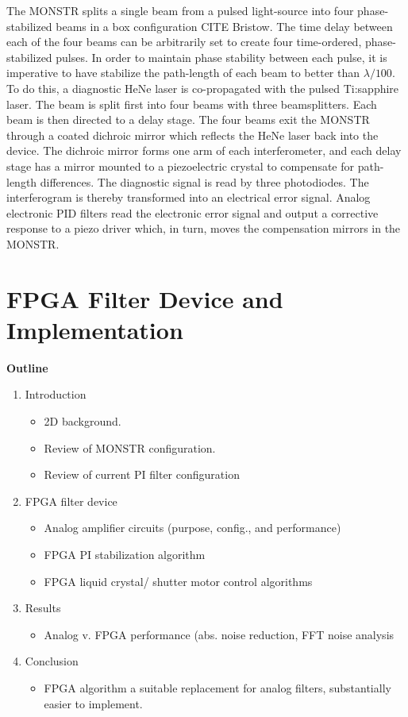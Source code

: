 \documentclass[letterpaper,12pt,amsmath,reprint,aip,jmp,twocolumn]{revtex4-1}
\begin{document}
\indent The MONSTR splits a single beam from a pulsed light-source into four phase-stabilized beams in a box configuration CITE Bristow. The time delay between each of the four beams can be arbitrarily set to create four time-ordered, phase-stabilized pulses. In order to maintain phase stability between each pulse, it is imperative to have stabilize the path-length of each beam to better than $\lambda/100$. To do this, a diagnostic HeNe laser is co-propagated with the pulsed Ti:sapphire laser. The beam is split first into four beams with three beamsplitters. Each beam is then directed to a delay stage. The four beams exit the MONSTR through a coated dichroic mirror which reflects the HeNe laser back into the device. The dichroic mirror forms one arm of each interferometer, and each delay stage has a mirror mounted to a piezoelectric crystal to compensate for path-length differences. The diagnostic signal is read by three photodiodes. The interferogram is thereby transformed into an electrical error signal. Analog electronic PID filters read the electronic error signal and output a corrective response to a piezo driver which, in turn, moves the compensation mirrors in the MONSTR.

\section{FPGA Filter Device and Implementation}
\Large{\textbf{Outline}}\\
\begin{enumerate}
\item Introduction
\begin{itemize}
\item 2D background.
\item Review of MONSTR configuration.
\item Review of current PI filter configuration
\end{itemize}
\item FPGA filter device
\begin{itemize}
\item Analog amplifier circuits (purpose, config., and performance)
\item FPGA PI stabilization algorithm
\item FPGA liquid crystal/ shutter motor control algorithms
\end{itemize}

\item Results
\begin{itemize}
\item Analog v. FPGA performance (abs. noise reduction, FFT noise analysis
\end{itemize}
\item Conclusion
\begin{itemize}
\item FPGA algorithm a suitable replacement for analog filters, substantially easier to implement.
\end{itemize}
\end{enumerate}
\end{document}
